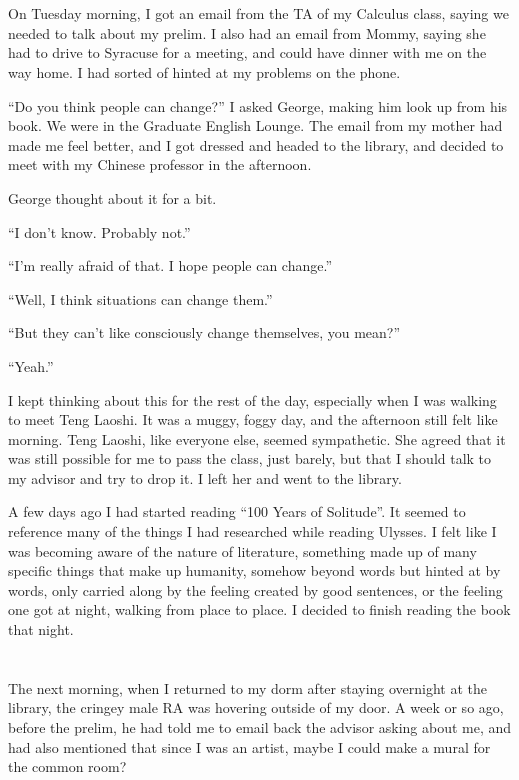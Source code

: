 \section{}

On Tuesday morning, I got an email from the TA of my Calculus class, saying we needed to
talk about my prelim.  I also had an email from Mommy, saying she had to drive
to Syracuse for a meeting, and could have dinner with me on the way home.  I had
sorted of hinted at my problems on the phone.  

``Do you think people can change?'' I asked George, making him look up from his
book.  We were in the Graduate English Lounge.  The email from my mother had
made me feel better, and I got dressed and headed to the library, and decided to
meet with my Chinese professor in the afternoon.

George thought about it for a bit.

``I don't know.  Probably not.''

``I'm really afraid of that.  I hope people can change.''

``Well, I think situations can change them.''

``But they can't like consciously change themselves, you mean?''

``Yeah.''

I kept thinking about this for the rest of the day, especially when I was
walking to meet Teng Laoshi.  It was a muggy, foggy day, and the afternoon still
felt like morning.  Teng Laoshi, like everyone else, seemed sympathetic.  She
agreed that it was still possible for me to pass the class, just barely, but
that I should talk to my advisor and try to drop it.  I left her and went to the
library.

A few days ago I had started reading ``100 Years of Solitude''.  It seemed to
reference many of the things I had researched while reading Ulysses.  I felt
like I was becoming aware of the nature of literature, something made up of many
specific things that make up humanity, somehow beyond words but hinted at by
words, only carried along by the feeling created by good sentences, or the
feeling one got at night, walking from place to place.  I decided to finish
reading the book that night.

\section{}

The next morning, when I returned to my dorm after staying overnight at the
library, the cringey male RA was hovering outside of my door.  A week or so ago,
before the prelim, he had told me to email back the advisor asking about me, and
had also mentioned that since I was an artist, maybe I could make a mural for
the common room?


